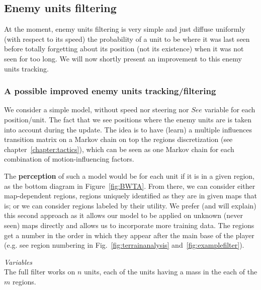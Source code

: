 \subsection{Enemy units filtering}

At the moment, enemy units filtering is very simple and just diffuse uniformly (with respect to its speed) the probability of a unit to be where it was last seen before totally forgetting about its position (not its existence) when it was not seen for too long. We will now shortly present an improvement to this enemy units tracking.

\subsubsection{A possible improved enemy units tracking/filtering}

\label{sec:enemyunitsfilter}
We consider a simple model, without speed nor steering nor $See$ variable for each position/unit. The fact that we see positions where the enemy units are is taken into account during the update.
The idea is to have (learn) a multiple influences transition matrix on a Markov chain on top the regions discretization (see chapter~\ref{chapter:tactics}), which can be seen as one Markov chain for each combination of motion-influencing factors.

The \textbf{perception} of such a model would be for each unit if it is in a given region, as the bottom diagram in Figure~\ref{fig:BWTA}. From there, we can consider either map-dependent regions, regions uniquely identified as they are in given maps that is; or we can consider regions labeled by their utility. We prefer (and will explain) this second approach as it allows our model to be applied on unknown (never seen) maps directly and allows us to incorporate more training data. The regions get a number in the order in which they appear after the main base of the player (e.g. see region numbering in Fig.~\ref{fig:terrainanalysis} and~\ref{fig:examplefilter}). %

\vspace{0.3cm}
\textit{Variables}\\
The full filter works on $n$ units, each of the units having a mass in the each of the $m$ regions.

